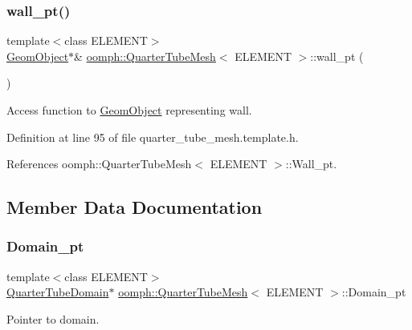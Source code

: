 \subsubsection{\texorpdfstring{wall\+\_\+pt()}{wall\_pt()}}
{\footnotesize\ttfamily template$<$class E\+L\+E\+M\+E\+NT$>$ \\
\hyperlink{classoomph_1_1GeomObject}{Geom\+Object}$\ast$\& \hyperlink{classoomph_1_1QuarterTubeMesh}{oomph\+::\+Quarter\+Tube\+Mesh}$<$ E\+L\+E\+M\+E\+NT $>$\+::wall\+\_\+pt (\begin{DoxyParamCaption}{ }\end{DoxyParamCaption})\hspace{0.3cm}{\ttfamily [inline]}}



Access function to \hyperlink{classoomph_1_1GeomObject}{Geom\+Object} representing wall. 



Definition at line 95 of file quarter\+\_\+tube\+\_\+mesh.\+template.\+h.



References oomph\+::\+Quarter\+Tube\+Mesh$<$ E\+L\+E\+M\+E\+N\+T $>$\+::\+Wall\+\_\+pt.



\subsection{Member Data Documentation}
\mbox{\label{classoomph_1_1QuarterTubeMesh_a250577dc1d699b4035a42ddabd84c121}} 
\subsubsection{\texorpdfstring{Domain\+\_\+pt}{Domain\_pt}}
{\footnotesize\ttfamily template$<$class E\+L\+E\+M\+E\+NT$>$ \\
\hyperlink{classoomph_1_1QuarterTubeDomain}{Quarter\+Tube\+Domain}$\ast$ \hyperlink{classoomph_1_1QuarterTubeMesh}{oomph\+::\+Quarter\+Tube\+Mesh}$<$ E\+L\+E\+M\+E\+NT $>$\+::Domain\+\_\+pt\hspace{0.3cm}{\ttfamily [protected]}}



Pointer to domain. 



